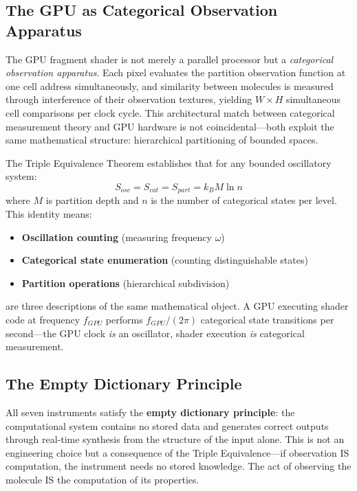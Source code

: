 \documentclass[11pt,a4paper]{article}
\theoremstyle{definition}
\theoremstyle{remark}
\begin{document}
\subsection{The GPU as Categorical Observation Apparatus}

The GPU fragment shader is not merely a parallel processor but a \textit{categorical observation apparatus}. Each pixel evaluates the partition observation function at one cell address simultaneously, and similarity between molecules is measured through interference of their observation textures, yielding $W \times H$ simultaneous cell comparisons per clock cycle. This architectural match between categorical measurement theory and GPU hardware is not coincidental—both exploit the same mathematical structure: hierarchical partitioning of bounded spaces.

The Triple Equivalence Theorem \cite{sachikonye2025bounded} establishes that for any bounded oscillatory system:
\begin{equation}
S_{osc} = S_{cat} = S_{part} = k_B M \ln n
\end{equation}
where $M$ is partition depth and $n$ is the number of categorical states per level. This identity means:
\begin{itemize}
\item \textbf{Oscillation counting} (measuring frequency $\omega$)
\item \textbf{Categorical state enumeration} (counting distinguishable states)
\item \textbf{Partition operations} (hierarchical subdivision)
\end{itemize}
are three descriptions of the same mathematical object. A GPU executing shader code at frequency $f_{GPU}$ performs $f_{GPU}/(2\pi)$ categorical state transitions per second—the GPU clock \textit{is} an oscillator, shader execution \textit{is} categorical measurement.

\subsection{The Empty Dictionary Principle}

All seven instruments satisfy the \textbf{empty dictionary principle}: the computational system contains no stored data and generates correct outputs through real-time synthesis from the structure of the input alone. This is not an engineering choice but a consequence of the Triple Equivalence—if observation IS computation, the instrument needs no stored knowledge. The act of observing the molecule IS the computation of its properties.
\end{document}

